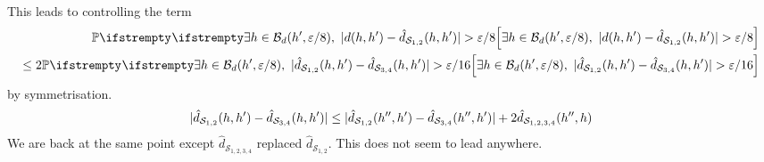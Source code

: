 \begin{tcolorbox}[colback=red!25, title=Proof Ideas]
\begin{align*}
	\end{align*}
	This leads to controlling the term
	\begin{align*}
		\PP{}{\exists \threequery \in \mathcal{B}_d(\threequery', \epsilon/8),\ |d(\threequery,\threequery')  -\hat d_{\mathcal{S}_{1,2}}(\threequery,\threequery')| > \epsilon/8}\\
		\leq 2 \PP{}{\exists \threequery \in \mathcal{B}_d(\threequery', \epsilon/8),\ |\hat d_{\mathcal{S}_{1,2}}(\threequery,\threequery')  -\hat d_{\mathcal{S}_{3,4}}(\threequery,\threequery')| > \epsilon/16}
	\end{align*}
	by symmetrisation.
	\begin{align*}
		|\hat d_{\mathcal{S}_{1,2}}(h,h')  -\hat d_{\mathcal{S}_{3,4}}(h,h')| \leq |\hat d_{\mathcal{S}_{1,2}}(h'',h')  -\hat d_{\mathcal{S}_{3,4}}(h'',h')| + 2 \hat d_{\mathcal{S}_{1,2,3,4}}(h'',h)
	\end{align*}
	We are back at the same point except $\hat d_{\mathcal{S}_{1,2,3,4}}$ replaced $\hat d_{\mathcal{S}_{1,2}}$. This does not seem to lead anywhere.
	
\end{tcolorbox}





